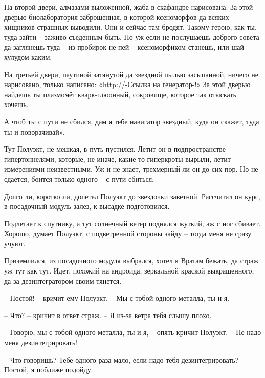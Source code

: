 \documentclass[ebook,oneside,final,openright]{memoir}
\begin{document}
\par
На второй двери, алмазами выложенной, жаба в скафандре нарисована. За этой дверью биолаборатория заброшенная, в которой ксеноморфов да всяких хищников страшных выводили. Они и сейчас там бродят. Такому герою, как ты, туда зайти – заживо съеденным быть. Но уж если не послушаешь доброго совета да заглянешь туда – из пробирок не пей – ксеноморфиком станешь, или шай-хулудом каким.\par
\par
На третьей двери, паутиной затянутой да звездной пылью засыпанной, ничего не нарисовано, только написано: «http://-Ссылка на генератор-!» За этой дверью найдешь ты плазмомёт кварк-глюонный, сокровище, которое так отыскать хочешь.\par
\par
А чтоб ты с пути не сбился, дам я тебе навигатор звездный, куда он скажет, туда ты и поворачивай».\par
\par
Тут Полуэкт, не мешкая, в путь пустился. Летит он в подпространстве гипертоннелями, которые, не иначе, какие-то гиперкроты вырыли, летит измерениями неизвестными. Уж и не знает, трехмерный ли он до сих пор. Но не сдается, боится только одного – с пути сбиться.\par
\par
Долго ли, коротко ли, долетел Полуэкт до звездочки заветной. Рассчитал он курс, в посадочный модуль залез, к высадке подготовился.\par
\par
Подлетает к спутнику, а тут солнечный ветер поднялся жуткий, аж с ног сбивает. Хорошо, думает Полуэкт, с подветренной стороны зайду – тогда меня не сразу учуют. \par
\par
 Приземлился, из посадочного модуля выбрался, хотел к Вратам бежать, да страж уж тут как тут. Идет, похожий на андроида, зеркальной краской выкрашенного, да за дезинтегратором своим тянется. \par
 \par
– Постой! – кричит ему Полуэкт. – Мы с тобой одного металла, ты и я. \par
– Что? – кричит в ответ страж. – Я из-за ветра тебя слышу плохо. \par
– Говорю, мы с тобой одного металла, ты и я, – опять кричит Полуэкт. – Не надо меня дезинтегрировать!\par
– Что говоришь? Тебе одного раза мало, если надо тебя дезинтегрировать? Постой, я поближе подойду. \par
\end{document}
